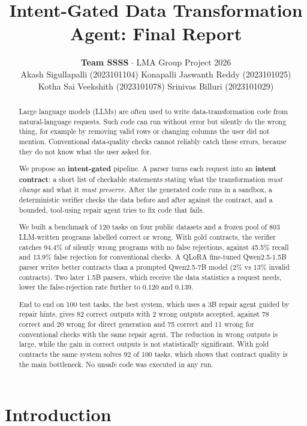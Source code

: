 \documentclass[11pt]{article}
\title{Intent-Gated Data Transformation Agent: Final Report}
\author{\textbf{Team SSSS} $\cdot$ LMA Group Project 2026 \\[4pt]
  Akash Sigullapalli (2023101104) \quad Konapalli Jaswanth Reddy (2023101025) \\
  Kotha Sai Veekshith (2023101078) \quad Srinivas Billuri (2023101029)}
\begin{document}
\maketitle
\begin{abstract}
Large language models (LLMs) are often used to write data-transformation
code from natural-language requests. Such code can run without error but
silently do the wrong thing, for example by removing valid rows or
changing columns the user did not mention. Conventional data-quality
checks cannot reliably catch these errors, because they do not know what
the user asked for.

We propose an \textbf{intent-gated} pipeline. A parser turns each
request into an \textbf{intent contract}: a short list of checkable
statements stating what the transformation \emph{must change} and what
it \emph{must preserve}. After the generated code runs in a sandbox, a
deterministic verifier checks the data before and after against the
contract, and a bounded, tool-using repair agent tries to fix code that
fails.

We built a benchmark of 120 tasks on four public datasets and a frozen
pool of 803 LLM-written programs labelled correct or wrong. With gold
contracts, the verifier catches 94.4\% of silently wrong programs with
no false rejections, against 45.5\% recall and 13.9\% false rejection
for conventional checks. A QLoRA fine-tuned Qwen2.5-1.5B parser writes
better contracts than a prompted Qwen2.5-7B model (2\% vs 13\% invalid
contracts). Two later 1.5B parsers, which receive the data statistics a
request needs, lower the false-rejection rate further to 0.120 and
0.139.

End to end on 100 test tasks, the best system, which uses a 3B repair
agent guided by repair hints, gives 82 correct outputs with 2 wrong
outputs accepted, against 78 correct and 20 wrong for direct generation
and 75 correct and 11 wrong for conventional checks with the same repair
agent. The reduction in wrong outputs is large, while the gain in
correct outputs is not statistically significant. With gold contracts
the same system solves 92 of 100 tasks, which shows that contract
quality is the main bottleneck. No unsafe code was executed in any run.

\end{abstract}

\section{Introduction}
\end{document}
